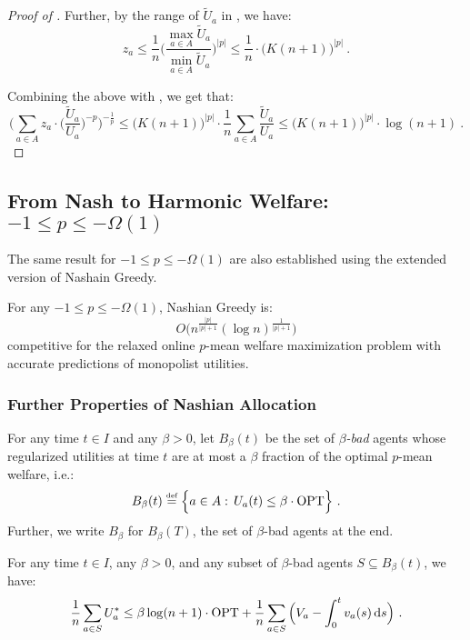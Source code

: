 \documentclass[11pt,letterpaper]{article}
\newcommand{\OPT}{\mathrm{OPT}}
\newcommand{\dif}[1]{\,\text{\rm d} #1}
\newcommand{\utility}{U}
\newcommand{\defeq}{\stackrel{\textrm{\tiny def}}{=}}
\begin{document}
\begin{proof}[Proof of ]
	Further, by the range of $\tilde{\utility}_a$ in , we have:
	\[
	z_a \le \frac{1}{n} \bigg( \frac{\max_{a \in A} \tilde{\utility}_a}{\min_{a \in A} \tilde{\utility}_a} \bigg)^{|p|} \le \frac{1}{n} \cdot \big(K(n+1)\big)^{|p|}
	~.
	\]
	
	Combining the above with , we get that:
	\[
	\bigg( \sum_{a \in A} z_a \cdot \Big( \frac{\tilde{\utility}_a}{\utility_a} \Big)^{-p} \bigg)^{-\frac{1}{p}}\le \big(K(n+1)\big)^{|p|} \cdot \frac{1}{n} \sum_{a \in A} \frac{\tilde{\utility}_a}{\utility_a} \le \big(K(n+1)\big)^{|p|} \cdot \log(n+1)
	~.
	\]
\end{proof}


\subsection[From Nash to Harmonic Welfare]{From Nash to Harmonic Welfare: $-1 \le p \le - \Omega(1)$}

The same result for $-1\leq p\leq -\Omega(1)$ are also established using the extended version of Nashain Greedy.

\begin{theorem}
	\label{thm:nashian-to-harmonic-app}
	For any $-1 \le p \le -	\Omega(1)$, Nashian Greedy is:
	\[
	O \Big( n^{\frac{|p|}{|p|+1}} (\log n)^{\frac{1}{|p|+1}} \Big)
	\]
	competitive for the relaxed online $p$-mean welfare maximization problem with accurate predictions of monopolist utilities.
\end{theorem}


\subsubsection{Further Properties of Nashian Allocation}

\begin{definition}
	For any time $t\in I$ and any $\beta > 0$, let $B_\beta(t)$ be the set of \emph{$\beta$-bad} agents whose regularized utilities at time $t$ are at most a $\beta$ fraction of the optimal $p$-mean welfare, i.e.:
	\[
	B_{\beta}(t) \defeq \Big\{a\in A:\,\utility_a(t) \leq \beta \cdot \OPT \Big\}
	~.
	\]
	Further, we write $B_\beta$ for $B_\beta(T)$, the set of $\beta$-bad agents at the end.
\end{definition}




\begin{lemma}
	\label{lem:bad-agents-optimal-utility-app}
	For any time $t\in I$, any $\beta > 0$, and any subset of $\beta$-bad agents $S \subseteq B_\beta(t)$, we have:
	\[
	\frac{1}{n} \sum_{a\in S} \utility_a^* 
	\leq \beta \log (n+1) \cdot \OPT + \frac{1}{n} \sum_{a\in S} \Big(V_a-\int_0^t v_a(s) \dif{s} \Big)
	~.
	\]
\end{lemma}
\end{document}
